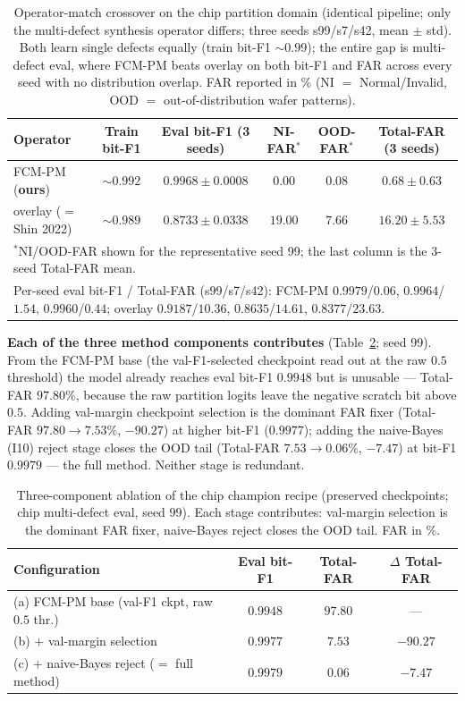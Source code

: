 \documentclass[11pt]{article}
\begin{document}
\begin{table}[t]
\centering
\caption{Operator-match crossover on the chip partition domain (identical pipeline;
only the multi-defect synthesis operator differs; three seeds s99/s7/s42, mean $\pm$
std). Both learn single defects equally (train bit-F1 ${\sim}0.99$); the entire gap is
multi-defect eval, where FCM-PM beats overlay on both bit-F1 and FAR across every seed
with no distribution overlap. FAR reported in \% (NI $=$ Normal/Invalid, OOD $=$
out-of-distribution wafer patterns).}
\label{tab:crossover}
\begin{tabular}{lccccc}
\toprule
Operator & Train bit-F1 & Eval bit-F1 (3 seeds) & NI-FAR$^{\ast}$ & OOD-FAR$^{\ast}$ & Total-FAR (3 seeds) \\
\midrule
FCM-PM (\textbf{ours}) & ${\sim}0.992$ & $\mathbf{0.9968 \pm 0.0008}$ & $\mathbf{0.00}$ & $\mathbf{0.08}$ & $\mathbf{0.68 \pm 0.63}$ \\
overlay ($=$ Shin 2022) & ${\sim}0.989$ & $0.8733 \pm 0.0338$ & $19.00$ & $7.66$ & $16.20 \pm 5.53$ \\
\bottomrule
\multicolumn{6}{l}{\footnotesize $^{\ast}$NI/OOD-FAR shown for the representative seed 99; the last column is the 3-seed Total-FAR mean.}\\
\multicolumn{6}{l}{\footnotesize Per-seed eval bit-F1 / Total-FAR (s99/s7/s42): FCM-PM $0.9979$/$0.06$, $0.9964$/$1.54$, $0.9960$/$0.44$; overlay $0.9187$/$10.36$, $0.8635$/$14.61$, $0.8377$/$23.63$.}
\end{tabular}
\end{table}

\textbf{Each of the three method components contributes} (Table~\ref{tab:chipablation}; seed 99).
From the FCM-PM base (the val-F1-selected checkpoint read out at the raw $0.5$
threshold) the model already reaches eval bit-F1 $0.9948$ but is unusable --- Total-FAR
$97.80\%$, because the raw partition logits leave the negative scratch bit above $0.5$.
Adding val-margin checkpoint selection is the dominant FAR fixer (Total-FAR
$97.80 \to 7.53\%$, $-90.27$) at higher bit-F1 ($0.9977$); adding the naive-Bayes (I10)
reject stage closes the OOD tail (Total-FAR $7.53 \to 0.06\%$, $-7.47$) at bit-F1
$0.9979$ --- the full method. Neither stage is redundant.

\begin{table}[t]
\centering
\caption{Three-component ablation of the chip champion recipe (preserved checkpoints;
chip multi-defect eval, seed 99). Each stage contributes: val-margin selection is the
dominant FAR fixer, naive-Bayes reject closes the OOD tail. FAR in \%.}
\label{tab:chipablation}
\begin{tabular}{lccc}
\toprule
Configuration & Eval bit-F1 & Total-FAR & $\Delta$ Total-FAR \\
\midrule
(a) FCM-PM base (val-F1 ckpt, raw $0.5$ thr.) & $0.9948$ & $97.80$ & --- \\
(b) $+$ val-margin selection & $0.9977$ & $7.53$ & $-90.27$ \\
(c) $+$ naive-Bayes reject ($=$ full method) & $\mathbf{0.9979}$ & $\mathbf{0.06}$ & $-7.47$ \\
\bottomrule
\end{tabular}
\end{table}
\end{document}
